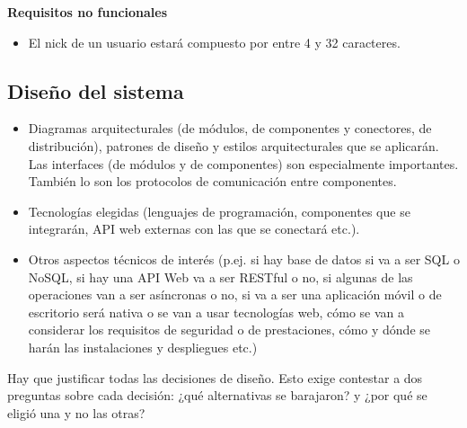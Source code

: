 \documentclass[12pt]{article}%
\begin{document}
\textbf{Requisitos no funcionales}
\begin{itemize}
	\item El nick de un usuario estar\'a compuesto por entre 4 y 32 caracteres.\\
	
\end{itemize}

\subsection{Dise\~no del sistema}
\begin{itemize}
	\item Diagramas arquitecturales (de m\'odulos, de componentes y conectores, de distribuci\'on), patrones de dise\~no y estilos arquitecturales que se aplicar\'an. Las interfaces (de m\'odulos y de componentes) son especialmente importantes. Tambi\'en lo son los protocolos de comunicaci\'on entre componentes.
	\item Tecnolog\'ias elegidas (lenguajes de programaci\'on, componentes que se integrar\'an, API web externas con las que se conectar\'a etc.).
	\item Otros aspectos t\'ecnicos de inter\'es (p.ej. si hay base de datos si va a ser SQL o NoSQL, si hay una API Web va a ser RESTful o no, si algunas de las operaciones van a ser as\'incronas o no, si va a ser una aplicaci\'on m\'ovil o de escritorio ser\'a nativa o se van a usar tecnolog\'ias web, c\'omo se van a considerar los requisitos de seguridad o de prestaciones, c\'omo y d\'onde se har\'an las instalaciones y despliegues etc.)
\end{itemize}

Hay que justificar todas las decisiones de dise\~no. Esto exige contestar a dos preguntas sobre cada decisi\'on: ¿qu\'e alternativas se barajaron? y ¿por qu\'e se eligi\'o una y no las otras?


\end{document}
